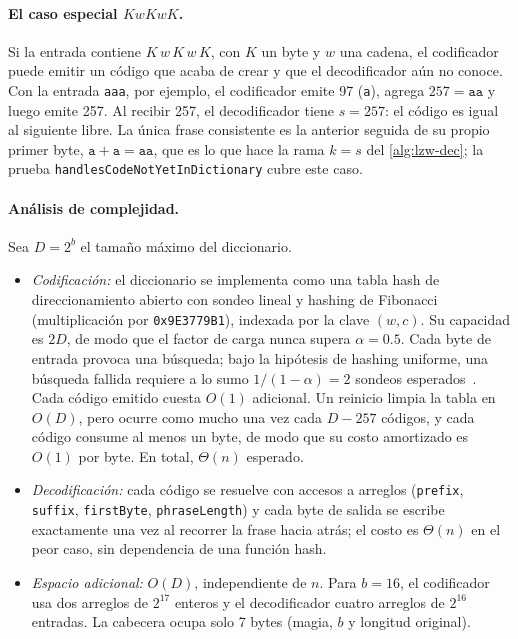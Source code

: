 \paragraph{El caso especial $KwKwK$.} Si la entrada contiene $K\,w\,K\,w\,K$, con $K$ un byte y
$w$ una cadena, el codificador puede emitir un código que acaba de crear y que el decodificador
aún no conoce. Con la entrada \texttt{aaa}, por ejemplo, el codificador emite 97
(\texttt{a}), agrega $257 = \texttt{aa}$ y luego emite 257. Al recibir 257, el decodificador
tiene $s = 257$: el código es igual al siguiente libre. La única frase consistente es la
anterior seguida de su propio primer byte, $\texttt{a} + \texttt{a} = \texttt{aa}$, que es lo
que hace la rama $k = s$ del \cref{alg:lzw-dec}; la prueba \texttt{handlesCodeNotYetInDictionary}
cubre este caso.

\paragraph{Análisis de complejidad.} Sea $D = 2^b$ el tamaño máximo del diccionario.
\begin{itemize}
  \item \emph{Codificación:} el diccionario se implementa como una tabla hash de
        direccionamiento abierto con sondeo lineal y hashing de Fibonacci (multiplicación por
        \texttt{0x9E3779B1}), indexada por la clave $(w, c)$. Su capacidad es $2D$, de modo que
        el factor de carga nunca supera $\alpha = 0.5$. Cada byte de entrada provoca una
        búsqueda; bajo la hipótesis de hashing uniforme, una búsqueda fallida requiere a lo
        sumo $1/(1-\alpha) = 2$ sondeos esperados~\cite{cormen2022}. Cada código emitido cuesta
        $O(1)$ adicional. Un reinicio limpia la tabla en $O(D)$, pero ocurre como mucho una vez
        cada $D - 257$ códigos, y cada código consume al menos un byte, de modo que su costo
        amortizado es $O(1)$ por byte. En total, $\Theta(n)$ esperado.
  \item \emph{Decodificación:} cada código se resuelve con accesos a arreglos
        (\texttt{prefix}, \texttt{suffix}, \texttt{firstByte}, \texttt{phraseLength}) y cada
        byte de salida se escribe exactamente una vez al recorrer la frase hacia atrás; el
        costo es $\Theta(n)$ en el peor caso, sin dependencia de una función hash.
  \item \emph{Espacio adicional:} $O(D)$, independiente de $n$. Para $b = 16$, el codificador
        usa dos arreglos de $2^{17}$ enteros y el decodificador cuatro arreglos de $2^{16}$
        entradas. La cabecera ocupa solo 7 bytes (magia, $b$ y longitud original).
\end{itemize}

